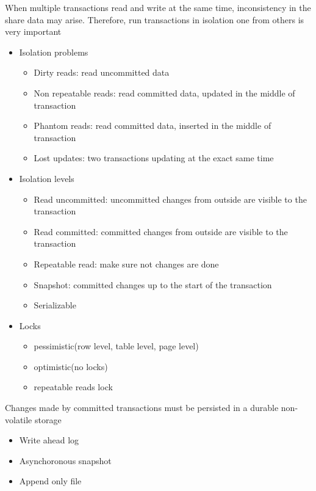 \documentclass[../main.tex]{subfiles}
\begin{document}
\begin{definition}[Isolation]
    When multiple transactions read and write at the same time, inconsistency in the share data may arise. Therefore, run transactions in isolation one from others is very important
    \begin{itemize}
        \item Isolation problems
        \begin{itemize}
            \item Dirty reads: read uncommitted data
            \item Non repeatable reads: read committed data, updated in the middle of transaction
            \item Phantom reads: read committed data, inserted in the middle of transaction
            \item Lost updates: two transactions updating at the exact same time
        \end{itemize}
        \item Isolation levels
        \begin{itemize}
            \item Read uncommitted: uncommitted changes from outside are visible to the transaction
            \item Read committed: committed changes from outside are visible to the transaction
            \item Repeatable read: make sure not changes are done
            \item Snapshot: committed changes up to the start of the transaction
            \item Serializable
        \end{itemize}
        \item Locks
        \begin{itemize}
            \item pessimistic(row level, table level, page level)
            \item optimistic(no locks)
            \item repeatable reads lock
        \end{itemize}
    \end{itemize}
\end{definition}


\begin{definition}[Durability]
    Changes made by committed transactions must be persisted in a durable non-volatile storage
    \begin{itemize}
        \item Write ahead log
        \item Asynchoronous snapshot
        \item Append only file
    \end{itemize}
\end{definition}
\end{document}
